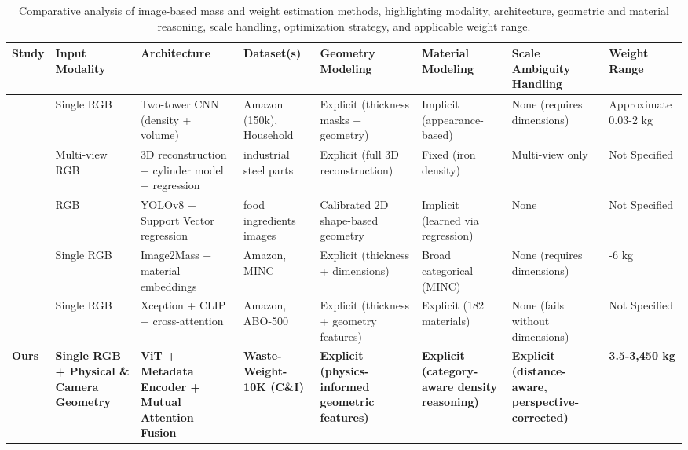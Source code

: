 \documentclass[journal,twoside,web]{ieeecolor}
\begin{document}
\begin{table}[ht!]
\centering

\caption{Comparative analysis of image-based mass and weight estimation methods, highlighting modality, architecture, geometric and material reasoning, scale handling, optimization strategy, and applicable weight range.}
\scriptsize
\begin{tabular}{
>{\centering\arraybackslash}p{0.9cm}
>{\centering\arraybackslash}p{1.5cm}
>{\centering\arraybackslash}p{2.8cm}
>{\centering\arraybackslash}p{2.3cm}
>{\centering\arraybackslash}p{2.5cm}
>{\centering\arraybackslash}p{2.2cm}
>{\centering\arraybackslash}p{1.8cm}
>{\centering\arraybackslash}p{1.6cm}
}
\midrule
\textbf{Study} &
\textbf{Input Modality} &
\textbf{Architecture} &
\textbf{Dataset(s)} &
\textbf{Geometry Modeling} &
\textbf{Material Modeling} &
\textbf{Scale Ambiguity Handling} &
\textbf{Weight Range} \\
\midrule


\cite{standley2017image2mass} &
Single RGB &
Two-tower CNN (density + volume) &
Amazon (150k), Household &
Explicit (thickness masks + geometry) &
Implicit (appearance-based) &
None (requires dimensions) &
Approximate  0.03-2 kg \\


\cite{sato2024image} &
Multi-view RGB &
3D reconstruction + cylinder model + regression &
100 industrial steel parts &
Explicit (full 3D reconstruction) &
Fixed (iron density) &
Multi-view only &
Not Specified \\

\cite{lee2025scalable} &
RGB &
YOLOv8 + Support Vector regression &
food ingredients images &
Calibrated 2D shape-based geometry &
Implicit (learned via regression) &
None &
Not Specified \\

\cite{nath2024mass} &
Single RGB &
Image2Mass + material embeddings &
Amazon, MINC &
Explicit (thickness + dimensions) &
Broad categorical (MINC) &
None (requires dimensions) &
0.6-6 kg \\

\cite{wang2025image2mass++} &
Single RGB &
Xception + CLIP + cross-attention &
Amazon, ABO-500 &
Explicit (thickness + geometry features) &
Explicit (182 materials) &
None (fails without dimensions) &
Not Specified \\

\textbf{Ours} &
\textbf{Single RGB + Physical \& Camera Geometry} &
\textbf{ViT + Metadata Encoder + Mutual Attention Fusion} &
\textbf{Waste-Weight-10K (C\&I)} &
\textbf{Explicit (physics-informed geometric features)} &
\textbf{Explicit (category-aware density reasoning)} &
\textbf{Explicit (distance-aware, perspective-corrected)} &
\textbf{3.5-3,450 kg} \\
\midrule
\end{tabular}
\label{tab:weight_estimation_comparison}
\end{table}
\end{document}
